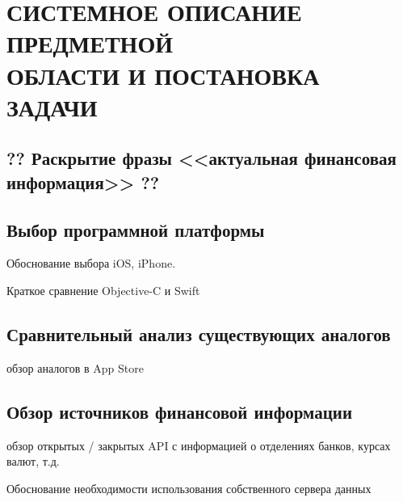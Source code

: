 \section[Системное описание предметной области и постановка задачи]{%
  СИСТЕМНОЕ ОПИСАНИЕ ПРЕДМЕТНОЙ \\
  ОБЛАСТИ И ПОСТАНОВКА ЗАДАЧИ
}\label{sec:spec}

\subsection{?? Раскрытие фразы <<актуальная финансовая информация>> ??}


\subsection{Выбор программной платформы}

Обоснование выбора iOS, iPhone.

Краткое сравнение Objective-C и Swift


\subsection{Сравнительный анализ существующих аналогов}

обзор аналогов в App Store


\subsection{Обзор источников финансовой информации}

обзор открытых / закрытых API с информацией о отделениях банков, курсах валют, т.д.

Обоснование необходимости использования собственного сервера данных
